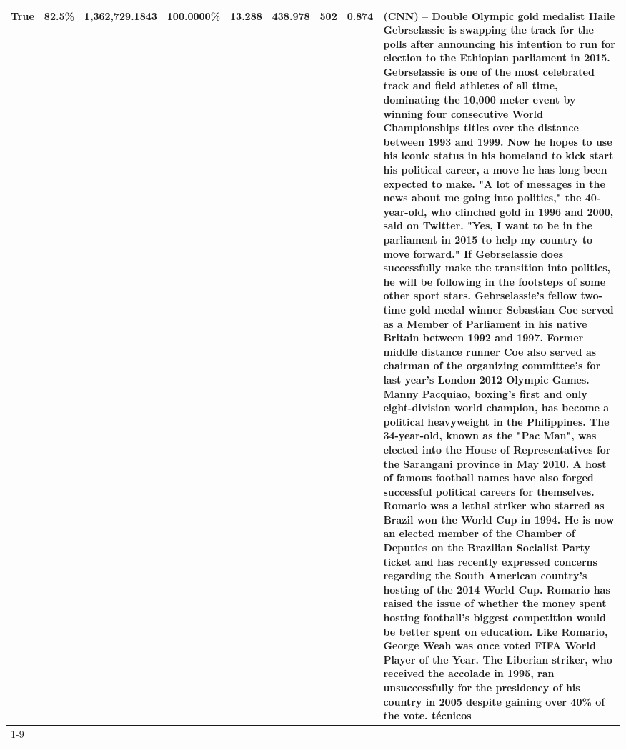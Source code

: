 \begin{table}[H]
{\begin{tabular}{lllrlllll}
True & 82.5\% & 1,362,729.1843 & \bfseries \color{red} 100.0000\% & 13.288 & 438.978 & 502 & 0.874 & (CNN) -- Double Olympic gold medalist Haile Gebrselassie is swapping the track for the polls after announcing his intention to run for election to the Ethiopian parliament in 2015. Gebrselassie is one of the most celebrated track and field athletes of all time, dominating the 10,000 meter event by winning four consecutive World Championships titles over the distance between 1993 and 1999. Now he hopes to use his iconic status in his homeland to kick start his political career, a move he has long been expected to make. "A lot of messages in the news about me going into politics," the 40-year-old, who clinched gold in 1996 and 2000, said on Twitter. "Yes, I want to be in the parliament in 2015 to help my country to move forward." If Gebrselassie does successfully make the transition into politics, he will be following in the footsteps of some other sport stars. Gebrselassie's fellow two-time gold medal winner Sebastian Coe served as a Member of Parliament in his native Britain between 1992 and 1997. Former middle distance runner Coe also served as chairman of the organizing committee's for last year's London 2012 Olympic Games. Manny Pacquiao, boxing's first and only eight-division world champion, has become a political heavyweight in the Philippines. The 34-year-old, known as the "Pac Man", was elected into the House of Representatives for the Sarangani province in May 2010. A host of famous football names have also forged successful political careers for themselves. Romario was a lethal striker who starred as Brazil won the World Cup in 1994. He is now an elected member of the Chamber of Deputies on the Brazilian Socialist Party ticket and has recently expressed concerns regarding the South American country's hosting of the 2014 World Cup. Romario has raised the issue of whether the money spent hosting football's biggest competition would be better spent on education. Like Romario, George Weah was once voted FIFA World Player of the Year. The Liberian striker, who received the accolade in 1995, ran unsuccessfully for the presidency of his country in 2005 despite gaining over 40\% of the vote. técnicos \\
\cline{1-9}

\end{tabular}}
\end{table}

